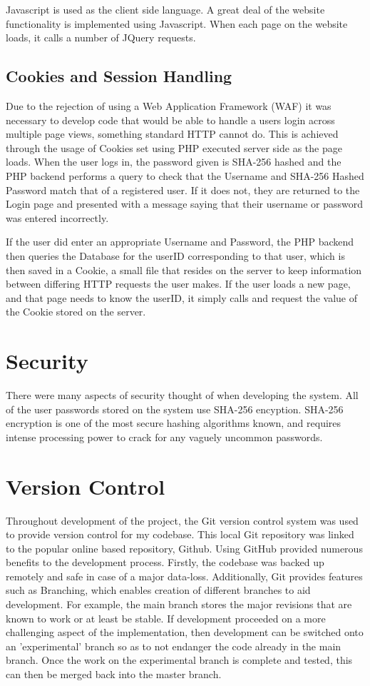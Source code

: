\documentclass{l4proj}
\begin{document}
Javascript is used as the client side language. A great deal of the website functionality is implemented using Javascript. When each page on the website loads, it calls a number of JQuery requests.

\subsection{Cookies and Session Handling}

Due to the rejection of using a Web Application Framework (WAF) it was necessary to develop code that would be able to handle a users login across multiple page views, something standard HTTP cannot do. This is achieved through the usage of Cookies set using PHP executed server side as the page loads. When the user logs in, the password given is SHA-256 hashed and the PHP backend performs a query to check that the Username and SHA-256 Hashed Password match that of a registered user. If it does not, they are returned to the Login page and presented with a message saying that their username or password was entered incorrectly. 

If the user did enter an appropriate Username and Password, the PHP backend then queries the Database for the userID corresponding to that user, which is then saved in a Cookie, a small file that resides on the server to keep information between differing HTTP requests the user makes. If the user loads a new page, and that page needs to know the userID, it simply calls and request the value of the Cookie stored on the server.

\section{Security}

There were many aspects of security thought of when developing the system. All of the user passwords stored on the system use SHA-256 encyption. SHA-256 encryption is one of the most secure hashing algorithms known, and requires intense processing power to crack for any vaguely uncommon passwords. 

\section{Version Control}

Throughout development of the project, the Git version control system was used to provide version control for my codebase. This local Git repository was linked to the popular online based repository, Github.  Using GitHub provided numerous benefits to the development process. Firstly, the codebase was backed up remotely and safe in case of a major data-loss. Additionally, Git provides features such as Branching, which enables creation of different branches to aid development. For example, the main branch stores the major revisions that are known to work or at least be stable. If development proceeded on a more challenging aspect of the implementation, then development can be switched onto an 'experimental' branch so as to not endanger the code already in the main branch. Once the work on the experimental branch is complete and tested, this can then be merged back into the master branch.
\end{document}
